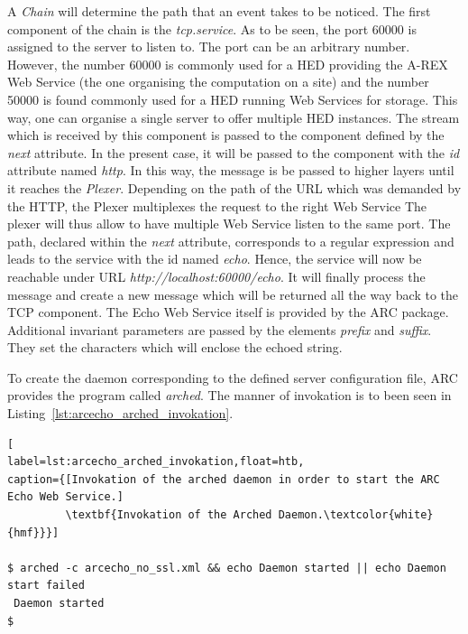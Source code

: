%
%
%
%
A \textit{Chain} will determine the path that an event takes to be noticed.
The first component of the chain is the \textit{tcp.service}.
As to be seen, the port 60000 is assigned to the server to listen to.
The port can be an arbitrary number.
However, the number 60000 is commonly used for a HED providing the A-REX Web Service (the one organising the computation on a site) and the number 50000 is found commonly used for a HED running Web Services for storage.
This way, one can organise a single server to offer multiple HED instances.
The stream which is received by this component is passed to the component defined by the \textit{next} attribute.
In the present case, it will be passed to the component with the \textit{id} attribute named \textit{http}.
In this way, the message is be passed to higher layers until it reaches the \textit{Plexer}.
Depending on the path of the URL which was demanded by the HTTP, the Plexer multiplexes the request to the right Web Service
The plexer will thus allow to have multiple Web Service listen to the same port.
The path, declared within the \textit{next} attribute, corresponds to a regular expression and leads to the service with the id named \textit{echo}. 
Hence, the service will now be reachable under URL \textit{http://localhost:60000/echo}.
It will finally process the message and create a new message which will be returned all the way back to the TCP component.
The Echo Web Service itself is provided by the ARC package.
Additional invariant parameters are passed by the elements \textit{prefix} and \textit{suffix}.
They set the characters which will enclose the echoed string.

To create the daemon corresponding to the defined server configuration file, ARC provides the program called \textit{arched}.
The manner of invokation is to been seen in Listing~\ref{lst:arcecho_arched_invokation}.
\begin{lstlisting}[
label=lst:arcecho_arched_invokation,float=htb,
caption={[Invokation of the arched daemon in order to start the ARC Echo Web Service.]
         \textbf{Invokation of the Arched Daemon.\textcolor{white}{hmf}}}]

$ arched -c arcecho_no_ssl.xml && echo Daemon started || echo Daemon start failed
 Daemon started
$
\end{lstlisting}

